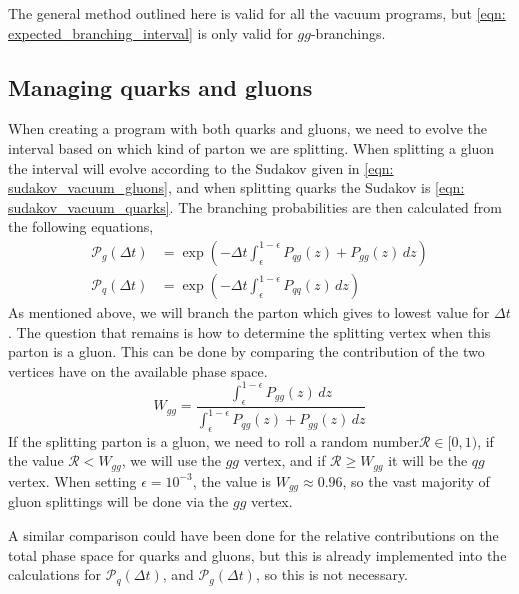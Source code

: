 \documentclass[main.tex]{subfiles}
\begin{document}
The general method outlined here is valid for all the vacuum programs, but \autoref{eqn: expected_branching_interval} is only valid for \(gg\)-branchings.

\subsection{Managing quarks and gluons}\label{sec: managing_quarks_and_gluons}
When creating a program with both quarks and gluons, we need to evolve the interval based on which kind of parton we are splitting. When splitting a gluon the interval will evolve according to the Sudakov given in \autoref{eqn: sudakov_vacuum_gluons}, and when splitting quarks the Sudakov is \autoref{eqn: sudakov_vacuum_quarks}. The branching probabilities are then calculated from the following equations,
\begin{align}
    \mathcal{P}_{g}(\Delta t) &= \exp\left(-\Delta t \int_\epsilon^{1-\epsilon} P_{qg}(z) + P_{gg}(z) \, dz \right)  \label{eqn: sudakov_splitting_interval_gluons}  \\
    \mathcal{P}_{q}(\Delta t) &= \exp\left(-\Delta t \int_\epsilon^{1-\epsilon} P_{qq}(z) \, dz \right) \label{eqn: sudakov_splitting_interval_quarks}
\end{align}
As mentioned above, we will branch the parton which gives to lowest value for \(\Delta t\). The question that remains is how to determine the splitting vertex when this parton is a gluon. This can be done by comparing the contribution of the two vertices have on the available phase space.
\begin{equation}\label{eqn: gluon_splitting_selection_ratios}
    W_{gg} = \frac{\int_\epsilon^{1-\epsilon} P_{gg}(z) \, dz}{\int_\epsilon^{1-\epsilon}P_{qg}(z) + P_{gg}(z) \, dz}
\end{equation}
If the splitting parton is a gluon, we need to roll a random number\(\mathcal{R}\in[0,1)\), if the value \(\mathcal{R}< W_{gg}\), we will use the \(gg\) vertex, and if \(\mathcal{R}\geq W_{gg}\) it will be the \(qg\) vertex. When setting \(\epsilon = 10^{-3}\), the value is \(W_{gg} \approx 0.96\), so the vast majority of gluon splittings will be done via the \(gg\) vertex.

A similar comparison could have been done for the relative contributions on the total phase space for quarks and gluons, but this is already implemented into the calculations for \(\mathcal{P}_q(\Delta t)\), and \(\mathcal{P}_g(\Delta t)\), so this is not necessary. 
\end{document}
